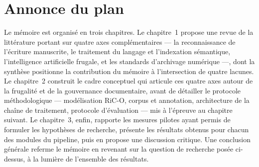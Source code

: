 \section*{Annonce du plan}

Le mémoire est organisé en trois chapitres.
Le chapitre~1 propose une revue de la littérature portant sur quatre axes complémentaires --- la reconnaissance de l'écriture manuscrite, le traitement du langage et l'indexation sémantique, l'intelligence artificielle frugale, et les standards d'archivage numérique ---, dont la synthèse positionne la contribution du mémoire à l'intersection de quatre lacunes.
Le chapitre~2 construit le cadre conceptuel qui articule ces quatre axes autour de la frugalité et de la gouvernance documentaire, avant de détailler le protocole méthodologique --- modélisation RiC-O, corpus et annotation, architecture de la chaîne de traitement, protocole d'évaluation --- mis à l'épreuve au chapitre suivant.
Le chapitre~3, enfin, rapporte les mesures pilotes ayant permis de formuler les hypothèses de recherche, présente les résultats obtenus pour chacun des modules du pipeline, puis en propose une discussion critique.
Une conclusion générale referme le mémoire en revenant sur la question de recherche posée ci-dessus, à la lumière de l'ensemble des résultats.